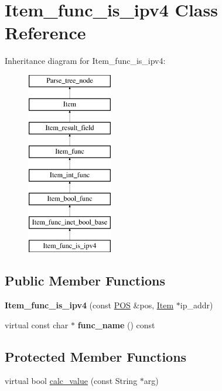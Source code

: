 \hypertarget{classItem__func__is__ipv4}{}\section{Item\+\_\+func\+\_\+is\+\_\+ipv4 Class Reference}
\label{classItem__func__is__ipv4}
Inheritance diagram for Item\+\_\+func\+\_\+is\+\_\+ipv4\+:\begin{figure}[H]
\begin{center}
\leavevmode
\includegraphics[height=8.000000cm]{classItem__func__is__ipv4}
\end{center}
\end{figure}
\subsection*{Public Member Functions}
\begin{DoxyCompactItemize}
\item 
\mbox{\label{classItem__func__is__ipv4_a04a6b08735521a264708f67e11df89ab}} 
{\bfseries Item\+\_\+func\+\_\+is\+\_\+ipv4} (const \mbox{\hyperlink{structYYLTYPE}{P\+OS}} \&pos, \mbox{\hyperlink{classItem}{Item}} $\ast$ip\+\_\+addr)
\item 
\mbox{\label{classItem__func__is__ipv4_a7382d8dc094a6417ba43da61b07dba37}} 
virtual const char $\ast$ {\bfseries func\+\_\+name} () const
\end{DoxyCompactItemize}
\subsection*{Protected Member Functions}
\begin{DoxyCompactItemize}
\item 
virtual bool \mbox{\hyperlink{classItem__func__is__ipv4_a9af9dc1c9207182c8a075fdc1e9e95e6}{calc\+\_\+value}} (const String $\ast$arg)
\end{DoxyCompactItemize}

